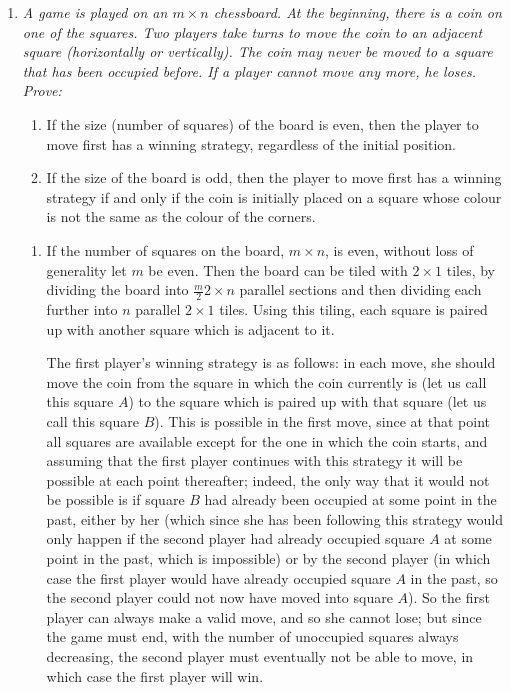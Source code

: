 \documentclass[a4paper, 12pt]{article}
\begin{document}
\begin{enumerate}
\item {\itshape A game is played on an $m \times n$ chessboard. At the beginning, there is a coin on one of the squares. Two players take turns to move the coin to an adjacent square (horizontally or vertically). The coin may never be moved to a square that has been occupied before. If a player cannot move any more, he loses. Prove:
\begin{enumerate}

\item If the size (number of squares) of the board is even, then the player to move first has a winning strategy, regardless of the initial position.

\item If the size of the board is odd, then the player to move first has a winning strategy if and only if the coin is initially placed on a square whose colour is not the same as the colour of the corners.

\end{enumerate}}

\begin{enumerate}

\item If the number of squares on the board, $m \times n$, is even, without loss of generality let $m$ be even. Then the board can be tiled with $2 \times 1$ tiles, by dividing the board into $\frac{m}{2} 2 \times n$ parallel sections and then dividing each further into $n$ parallel $2 \times 1$ tiles. Using this tiling, each square is paired up with another square which is adjacent to it.

The first player's winning strategy is as follows: in each move, she should move the coin from the square in which the coin currently is (let us call this square $A$) to the square which is paired up with that square (let us call this square $B$). This is possible in the first move, since at that point all squares are available except for the one in which the coin starts, and assuming that the first player continues with this strategy it will be possible at each point thereafter; indeed, the only way that it would not be possible is if square $B$ had already been occupied at some point in the past, either by her (which since she has been following this strategy would only happen if the second player had already occupied square $A$ at some point in the past, which is impossible) or by the second player (in which case the first player would have already occupied square $A$ in the past, so the second player could not now have moved into square $A$). So the first player can always make a valid move, and so she cannot lose; but since the game must end, with the number of unoccupied squares always decreasing, the second player must eventually not be able to move, in which case the first player will win.


\end{enumerate}
\end{enumerate}
\end{document}
